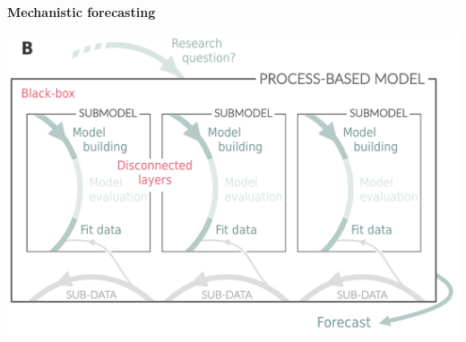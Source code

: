 \documentclass[11pt]{article}
\begin{document}
\begin{tcolorbox}
{\begin{multicols}{2}


\vfill

\columnbreak

\centerline{\bf Mechanistic forecasting}
\vspace*{2mm}
\begin{minipage}[t]{\linewidth}
    \includegraphics[width=\linewidth]{figures/forecasting_details}


\end{minipage}
\end{multicols}}
\end{tcolorbox}
\end{document}
